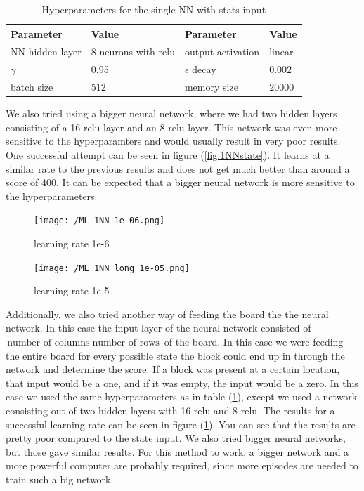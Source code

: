 \documentclass{report}
\begin{document}
\begin{table}[]
    \centering
    \begin{tabular}{|l|l||l|l|}
        \hline
        Parameter & Value & Parameter & Value \\ \hline
        NN hidden layer &  8 neurons with relu & output activation & linear \\
        $\gamma$ & 0.95 & $\epsilon$ decay & 0.002 \\
        batch size & 512 & memory size & 20000 \\
        \hline
    \end{tabular}
    \caption{Hyperparameters for the single NN with stats input}
    \label{tab:1NN_simple}
\end{table}
We also tried using a bigger neural network, where we had two hidden layers consisting of a 16 relu layer and an 8 relu layer. This network was even more sensitive to the hyperparamters and would usually result in very poor results. One successful attempt can be seen in figure (\ref{fig:1NNstate}). It learns at a similar rate to the previous results and does not get much better than around a score of 400. It can be expected that a bigger neural network is more sensitive to the hyperparameters.
\begin{figure}[h]
	\centering
	\begin{minipage}[b]{0.45\textwidth}
   		\texttt{[image: /ML\_1NN\_1e-06.png]}
    	\caption{learning rate 1e-6}
    	\label{fig:1NNstate}
 	\end{minipage}
  	\begin{minipage}[b]{0.45\textwidth}
    	\texttt{[image: /ML\_1NN\_long\_1e-05.png]}
    	\caption{learning rate 1e-5}
    	\label{fig:1NNboard}
 	\end{minipage}
\end{figure}
Additionally, we also tried another way of feeding the board the the neural network. In this case the input layer of the neural network consisted of $\text{number of columns}\cdot\text{number of rows}$ of the board. In this case we were feeding the entire board for every possible state the block could end up in through the network and determine the score. If a block was present at a certain location, that input would be a one, and if it was empty, the input would be a zero. In this case we used the same hyperparameters as in table (\ref{tab:1NN_simple}), except we used a network consisting out of two hidden layers with 16 relu and 8 relu. The results for a successful learning rate can be seen in figure (\ref{fig:1NNboard}). You can see that the results are pretty poor compared to the state input. We also tried bigger neural networks, but those gave similar results. For this method to work, a bigger network and a more powerful computer are probably required, since more episodes are needed to train such a big network.
\end{document}
